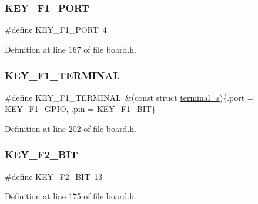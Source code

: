 \subsubsection{\texorpdfstring{K\+E\+Y\+\_\+\+F1\+\_\+\+P\+O\+RT}{KEY\_F1\_PORT}}
{\footnotesize\ttfamily \#define K\+E\+Y\+\_\+\+F1\+\_\+\+P\+O\+RT~4}



Definition at line 167 of file board.\+h.

\mbox{\label{group__hal_ga5626e4124830d632401a45cef41ab012}} 
\subsubsection{\texorpdfstring{K\+E\+Y\+\_\+\+F1\+\_\+\+T\+E\+R\+M\+I\+N\+AL}{KEY\_F1\_TERMINAL}}
{\footnotesize\ttfamily \#define K\+E\+Y\+\_\+\+F1\+\_\+\+T\+E\+R\+M\+I\+N\+AL~\&(const struct \hyperlink{structterminal__s}{terminal\+\_\+s})\{.port = \hyperlink{group__hal_ga5ca4d37214720b82e845407c6fa2347a}{K\+E\+Y\+\_\+\+F1\+\_\+\+G\+P\+IO}, .pin = \hyperlink{group__hal_gaa5e208d84a752a40a307c23236dc60e2}{K\+E\+Y\+\_\+\+F1\+\_\+\+B\+IT}\}}



Definition at line 202 of file board.\+h.

\mbox{\label{group__hal_gaa1529bc5c7a8cc9c0221078f2425eed8}} 
\subsubsection{\texorpdfstring{K\+E\+Y\+\_\+\+F2\+\_\+\+B\+IT}{KEY\_F2\_BIT}}
{\footnotesize\ttfamily \#define K\+E\+Y\+\_\+\+F2\+\_\+\+B\+IT~13}



Definition at line 175 of file board.\+h.

\mbox{\label{group__hal_ga84995a20a536edfbc062b220c761768e}} 

